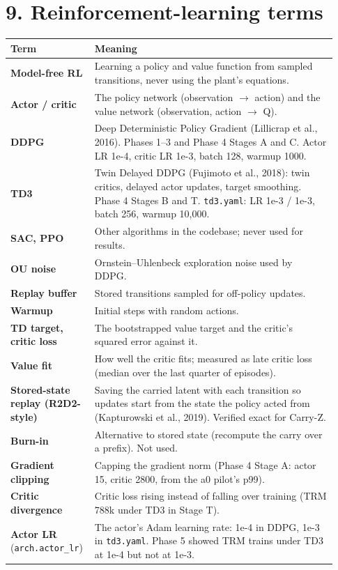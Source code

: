 \documentclass[11pt]{article}
\begin{document}
\section*{9. Reinforcement-learning terms}



\begin{center}\small\begin{tabular}{>{\raggedright\arraybackslash}p{0.206\linewidth}>{\raggedright\arraybackslash}p{0.728\linewidth}}
\toprule
Term & Meaning \\
\midrule
\textbf{Model-free RL} & Learning a policy and value function from sampled transitions, never using the plant's equations. \\
\textbf{Actor / critic} & The policy network (observation $\rightarrow$ action) and the value network (observation, action $\rightarrow$ Q). \\
\textbf{DDPG} & Deep Deterministic Policy Gradient (Lillicrap et al., 2016). Phases 1--3 and Phase 4 Stages A and C. Actor LR 1e-4, critic LR 1e-3, batch 128, warmup 1000. \\
\textbf{TD3} & Twin Delayed DDPG (Fujimoto et al., 2018): twin critics, delayed actor updates, target smoothing. Phase 4 Stages B and T. \texttt{td3.yaml}: LR 1e-3 / 1e-3, batch 256, warmup 10,000. \\
\textbf{SAC, PPO} & Other algorithms in the codebase; never used for results. \\
\textbf{OU noise} & Ornstein--Uhlenbeck exploration noise used by DDPG. \\
\textbf{Replay buffer} & Stored transitions sampled for off-policy updates. \\
\textbf{Warmup} & Initial steps with random actions. \\
\textbf{TD target, critic loss} & The bootstrapped value target and the critic's squared error against it. \\
\textbf{Value fit} & How well the critic fits; measured as late critic loss (median over the last quarter of episodes). \\
\textbf{Stored-state replay (R2D2-style)} & Saving the carried latent with each transition so updates start from the state the policy acted from (Kapturowski et al., 2019). Verified exact for Carry-Z. \\
\textbf{Burn-in} & Alternative to stored state (recompute the carry over a prefix). Not used. \\
\textbf{Gradient clipping} & Capping the gradient norm (Phase 4 Stage A: actor 15, critic 2800, from the a0 pilot's p99). \\
\textbf{Critic divergence} & Critic loss rising instead of falling over training (TRM 788k under TD3 in Stage T). \\
\textbf{Actor LR} (\texttt{arch.actor\_lr}) & The actor's Adam learning rate: 1e-4 in DDPG, 1e-3 in \texttt{td3.yaml}. Phase 5 showed TRM trains under TD3 at 1e-4 but not at 1e-3. \\
\bottomrule
\end{tabular}\end{center}
\end{document}
